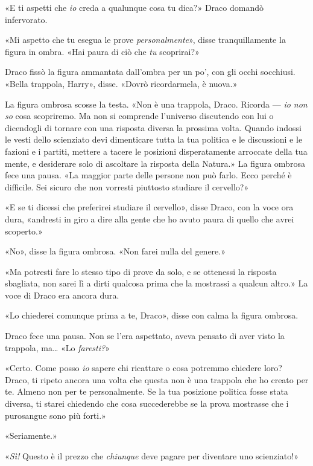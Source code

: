 «E ti aspetti che \textit{io} creda a qualunque cosa tu dica?» Draco domandò infervorato.

«Mi aspetto che tu esegua le prove \textit{personalmente}», disse tranquillamente la figura in ombra. «Hai paura di ciò che \textit{tu} scoprirai?»

Draco fissò la figura ammantata dall’ombra per un po’, con gli occhi socchiusi. «Bella trappola, Harry», disse. «Dovrò ricordarmela, è nuova.»

La figura ombrosa scosse la testa. «Non è una trappola, Draco. Ricorda — \textit{io non so} cosa scopriremo. Ma non si comprende l’universo discutendo con lui o dicendogli di tornare con una risposta diversa la prossima volta. Quando indossi le vesti dello scienziato devi dimenticare tutta la tua politica e le discussioni e le fazioni e i partiti, mettere a tacere le posizioni disperatamente arroccate della tua mente, e desiderare solo di ascoltare la risposta della Natura.» La figura ombrosa fece una pausa. «La maggior parte delle persone non può farlo. Ecco perché è difficile. Sei sicuro che non vorresti piuttosto studiare il cervello?»

«E se ti dicessi che preferirei studiare il cervello», disse Draco, con la voce ora dura, «andresti in giro a dire alla gente che ho avuto paura di quello che avrei scoperto.»

«No», disse la figura ombrosa. «Non farei nulla del genere.»

«Ma potresti fare lo stesso tipo di prove da solo, e se ottenessi la risposta sbagliata, non sarei lì a dirti qualcosa prima che la mostrassi a qualcun altro.» La voce di Draco era ancora dura.

«Lo chiederei comunque prima a te, Draco», disse con calma la figura ombrosa.

Draco fece una pausa. Non se l’era aspettato, aveva pensato di aver visto la trappola, ma… «Lo \textit{faresti?}»

«Certo. Come posso \textit{io} sapere chi ricattare o cosa potremmo chiedere loro? Draco, ti ripeto ancora una volta che questa non è una trappola che ho creato per te. Almeno non per te personalmente. Se la tua posizione politica fosse stata diversa, ti starei chiedendo che cosa succederebbe se la prova mostrasse che i purosangue sono più forti.»

«Seriamente.»

«\textit{Sì!} Questo è il prezzo che \textit{chiunque} deve pagare per diventare uno scienziato!»

